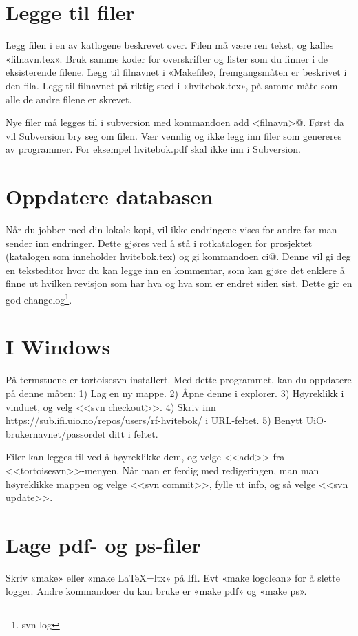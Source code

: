 \documentclass[11pt,norsk,a4paper,pointlessnumbers]{scrbook}
\begin{document}
\section{Legge til filer}
Legg filen i en av katlogene beskrevet over. Filen må være ren tekst,
og kalles «filnavn.tex». Bruk samme koder for overskrifter og lister
som du finner i de eksisterende filene. Legg til filnavnet i «Makefile»,
fremgangsmåten er beskrivet i den fila. Legg til filnavnet på riktig
sted i «hvitebok.tex», på samme måte som alle de andre filene er skrevet.

Nye filer må legges til i subversion med kommandoen \verb@svn add <filnavn>@.
Først da vil Subversion bry seg om filen. Vær vennlig og ikke legg inn filer
som genereres av programmer. For eksempel hvitebok.pdf skal ikke inn i Subversion.

\section{Oppdatere databasen}
Når du jobber med din lokale kopi, vil ikke endringene vises for andre før man
sender inn endringer. Dette gjøres ved å stå i rotkatalogen for prosjektet (katalogen
som inneholder hvitebok.tex) og gi kommandoen \verb@svn ci@. Denne vil gi deg en teksteditor
hvor du kan legge inn en kommentar, som kan gjøre det enklere å finne ut hvilken revisjon
som har hva og hva som er endret siden sist. Dette gir en god changelog\footnote{svn log}.

\section{I Windows}
På termstuene er tortoisesvn installert. Med dette programmet, kan du oppdatere på denne måten:
1) Lag en ny mappe. 2) Åpne denne i explorer. 3) Høyreklikk i vinduet, og velg <<svn checkout>>.
4) Skriv inn \url{https://sub.ifi.uio.no/repos/users/rf-hvitebok/} i URL-feltet. 
5) Benytt UiO-brukernavnet/passordet ditt i feltet.

Filer kan legges til ved å høyreklikke dem, og velge <<add>> fra <<tortoisesvn>>-menyen. Når man er
ferdig med redigeringen, man man høyreklikke mappen og velge <<svn commit>>, fylle ut info, og så
velge <<svn update>>.

\section{Lage pdf- og ps-filer}
Skriv «make» eller «make LaTeX=ltx» på IfI.
Evt «make logclean» for å slette logger.
Andre kommandoer du kan bruke er «make pdf» og «make ps».
\end{document}
